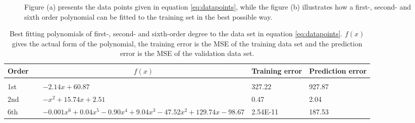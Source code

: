 \begin{figure}
	\centering
	\caption{Figure (a) presents the data points given in equation \eqref{eq:datapoints}, while the figure (b) illustrates how a first-, second- and sixth order polynomial can be fitted to the training set in the best possible way.}%
	\label{fig:polynomials}
\end{figure}

\begin{table}
	\caption{Best fitting polynomials of first-, second- and sixth-order degree to the data set in equation \eqref{eq:datapoints}. $f(x)$ gives the actual form of the polynomial, the training error is the MSE of the training data set and the prediction error is the MSE of the validation data set.}
	\label{tab:example}
	\begin{tabularx}{\textwidth}{llR{6.5cm}R{3cm}R{3cm}} \hline\hline
		Order & \makecell{\\ \phantom{=}} &  & Training error & Prediction error \\ \hline \\
		
		1st && $-2.14x+60.87$ & 327.22 & 927.87 \\
		2nd && $-x^2+15.74x + 2.51$ & 0.47 & 2.04 \\
		6th && $-0.001x^6+0.04x^5-0.90x^4+9.04x^3-47.52x^2+129.74x-98.67$ & 2.54E-11 & 187.53 \\ \hline\hline
	\end{tabularx}
\end{table}

